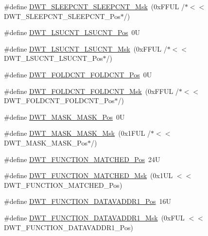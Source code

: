 \begin{DoxyCompactItemize}
\item 
\#define \hyperlink{group___c_m_s_i_s___d_w_t_ga1e340751d71413fef400a0a1d76cc828}{D\-W\-T\-\_\-\-S\-L\-E\-E\-P\-C\-N\-T\-\_\-\-S\-L\-E\-E\-P\-C\-N\-T\-\_\-\-Msk}~(0x\-F\-F\-U\-L /$\ast$$<$$<$ D\-W\-T\-\_\-\-S\-L\-E\-E\-P\-C\-N\-T\-\_\-\-S\-L\-E\-E\-P\-C\-N\-T\-\_\-\-Pos$\ast$/)
\item 
\#define \hyperlink{group___c_m_s_i_s___d_w_t_gab9394c7911b0b4312a096dad91d53a3d}{D\-W\-T\-\_\-\-L\-S\-U\-C\-N\-T\-\_\-\-L\-S\-U\-C\-N\-T\-\_\-\-Pos}~0\-U
\item 
\#define \hyperlink{group___c_m_s_i_s___d_w_t_ga2186d7fc9317e20bad61336ee2925615}{D\-W\-T\-\_\-\-L\-S\-U\-C\-N\-T\-\_\-\-L\-S\-U\-C\-N\-T\-\_\-\-Msk}~(0x\-F\-F\-U\-L /$\ast$$<$$<$ D\-W\-T\-\_\-\-L\-S\-U\-C\-N\-T\-\_\-\-L\-S\-U\-C\-N\-T\-\_\-\-Pos$\ast$/)
\item 
\#define \hyperlink{group___c_m_s_i_s___d_w_t_ga7f8af5ac12d178ba31a516f6ed141455}{D\-W\-T\-\_\-\-F\-O\-L\-D\-C\-N\-T\-\_\-\-F\-O\-L\-D\-C\-N\-T\-\_\-\-Pos}~0\-U
\item 
\#define \hyperlink{group___c_m_s_i_s___d_w_t_ga9cb73d0342d38b14e41027d3c5c02647}{D\-W\-T\-\_\-\-F\-O\-L\-D\-C\-N\-T\-\_\-\-F\-O\-L\-D\-C\-N\-T\-\_\-\-Msk}~(0x\-F\-F\-U\-L /$\ast$$<$$<$ D\-W\-T\-\_\-\-F\-O\-L\-D\-C\-N\-T\-\_\-\-F\-O\-L\-D\-C\-N\-T\-\_\-\-Pos$\ast$/)
\item 
\#define \hyperlink{group___c_m_s_i_s___d_w_t_gaf798ae34e2b9280ea64f4d9920cd2e7d}{D\-W\-T\-\_\-\-M\-A\-S\-K\-\_\-\-M\-A\-S\-K\-\_\-\-Pos}~0\-U
\item 
\#define \hyperlink{group___c_m_s_i_s___d_w_t_gadd798deb0f1312feab4fb05dcddc229b}{D\-W\-T\-\_\-\-M\-A\-S\-K\-\_\-\-M\-A\-S\-K\-\_\-\-Msk}~(0x1\-F\-U\-L /$\ast$$<$$<$ D\-W\-T\-\_\-\-M\-A\-S\-K\-\_\-\-M\-A\-S\-K\-\_\-\-Pos$\ast$/)
\item 
\#define \hyperlink{group___c_m_s_i_s___d_w_t_ga22c5787493f74a6bacf6ffb103a190ba}{D\-W\-T\-\_\-\-F\-U\-N\-C\-T\-I\-O\-N\-\_\-\-M\-A\-T\-C\-H\-E\-D\-\_\-\-Pos}~24\-U
\item 
\#define \hyperlink{group___c_m_s_i_s___d_w_t_gac8b1a655947490280709037808eec8ac}{D\-W\-T\-\_\-\-F\-U\-N\-C\-T\-I\-O\-N\-\_\-\-M\-A\-T\-C\-H\-E\-D\-\_\-\-Msk}~(0x1\-U\-L $<$$<$ D\-W\-T\-\_\-\-F\-U\-N\-C\-T\-I\-O\-N\-\_\-\-M\-A\-T\-C\-H\-E\-D\-\_\-\-Pos)
\item 
\#define \hyperlink{group___c_m_s_i_s___d_w_t_ga8b75e8ab3ffd5ea2fa762d028dc30e8c}{D\-W\-T\-\_\-\-F\-U\-N\-C\-T\-I\-O\-N\-\_\-\-D\-A\-T\-A\-V\-A\-D\-D\-R1\-\_\-\-Pos}~16\-U
\item 
\#define \hyperlink{group___c_m_s_i_s___d_w_t_gafdbf5a8c367befe8661a4f6945c83445}{D\-W\-T\-\_\-\-F\-U\-N\-C\-T\-I\-O\-N\-\_\-\-D\-A\-T\-A\-V\-A\-D\-D\-R1\-\_\-\-Msk}~(0x\-F\-U\-L $<$$<$ D\-W\-T\-\_\-\-F\-U\-N\-C\-T\-I\-O\-N\-\_\-\-D\-A\-T\-A\-V\-A\-D\-D\-R1\-\_\-\-Pos)

\end{DoxyCompactItemize}
